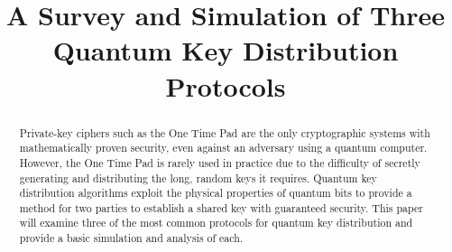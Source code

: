 \documentclass[conference]{IEEEtran}
\begin{document}
\newcommand{\iu}{{i\mkern1mu}}
%
\title{A Survey and Simulation of Three Quantum Key Distribution Protocols}

\author{
}


\maketitle

\begin{abstract}
Private-key ciphers such as the One Time Pad are the only cryptographic systems with mathematically proven security, even against an adversary using a quantum computer. However, the One Time Pad is rarely used in practice due to the difficulty of secretly generating and distributing the long, random keys it requires. Quantum key distribution algorithms exploit the physical properties of quantum bits to provide a method for two parties to establish a shared key with guaranteed security. This paper will examine three of the most common protocols for quantum key distribution and provide a basic simulation and analysis of each.
\end{abstract}


%
\IEEEpeerreviewmaketitle
\end{document}
